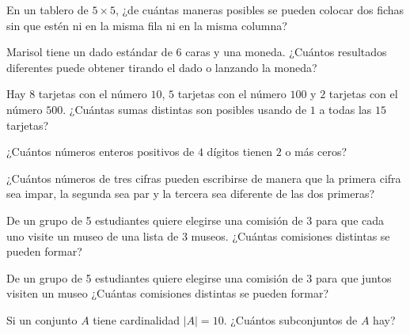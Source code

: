 \begin{problema}
En un tablero de $5\times 5$, ¿de cuántas maneras posibles se pueden colocar dos fichas sin que estén ni en la misma fila ni en la misma columna?
\end{problema}

\begin{problema}
Marisol tiene un dado estándar de $6$ caras y una moneda.  ¿Cuántos resultados diferentes puede obtener tirando el dado o lanzando la moneda?
\end{problema}

\begin{problema}
    Hay $8$ tarjetas con el número $10$, $5$ tarjetas con el número $100$ y $2$ tarjetas con el número $500$. ¿Cuántas sumas distintas son posibles usando de $1$ a todas las $15$ tarjetas?
\end{problema}

\begin{problema}
    ¿Cuántos números enteros positivos de $4$ dígitos tienen $2$ o más ceros?
\end{problema}

\begin{problema}
¿Cuántos números de tres cifras pueden escribirse de manera que la primera cifra sea impar, la segunda sea par y la tercera sea diferente de las dos primeras?
\end{problema}

\begin{problema}
    De un grupo de 5 estudiantes quiere elegirse una comisión de 3 para que cada uno visite un museo de una lista de 3 museos. ¿Cuántas comisiones distintas se pueden formar?
\end{problema}

\begin{problema}
    De un grupo de 5 estudiantes quiere elegirse una comisión de 3 para que juntos visiten un museo ¿Cuántas comisiones distintas se pueden formar?
\end{problema}

\begin{problema}
    Si un conjunto $A$ tiene cardinalidad $|A|=10$. ¿Cuántos subconjuntos de $A$ hay?
\end{problema}
